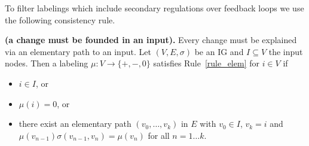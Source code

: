 To filter labelings which include secondary regulations over feedback loops we use the following consistency rule.
  
\begin{srule}\label{rule_elem}{\bf (a change must be founded in an input).}
Every change must be explained via an elementary path to an input.
Let $(V,E,\sigma)$ be an IG and $I \subseteq V$ the input nodes.
Then a labeling $\mu : V \rightarrow \{\plus,\minus,0\}$ satisfies Rule~\ref{rule_elem} for $i \in V$ if
 \begin{itemize}
  \item $i \in I$, or
  \item $\mu(i)=0$, or
  \item there exist an elementary path $(v_0,\dots,v_k)$ in $E$ with $v_0 \in I$, $v_k=i$ and
 $\mu(v_{n-1})\sigma(v_{n-1},v_n)=\mu(v_{n})$ for all $n=1\dots k$.
 \end{itemize}
\end{srule}
